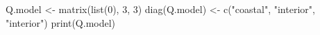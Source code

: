 \begin{Schunk}
\begin{Sinput}
 Q.model <- matrix(list(0), 3, 3)
 diag(Q.model) <- c("coastal", "interior", "interior")
 print(Q.model)
\end{Sinput}
\end{Schunk}
